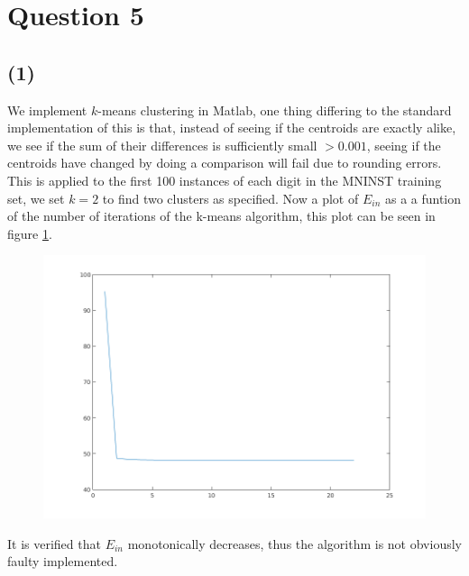 \documentclass[a4paper]{article}
\begin{document}
\newpage
\section*{Question 5}
\subsection*{(1)}
We implement $k$-means clustering in Matlab, one thing differing to the standard implementation of this is that, instead of seeing if the centroids are exactly alike, we see if the sum of their differences is sufficiently small $> 0.001$, seeing if the centroids have changed by doing a comparison will fail due to rounding errors.
\\
This is applied to the first 100 instances of each digit in the MNINST training set, we set $k = 2$ to find two clusters as specified. Now a plot of $E_{in}$ as a a funtion of the number of iterations of the k-means algorithm, this plot can be seen in figure \ref{opg51}.
\begin{figure}[H]
  \centering
  \includegraphics[width=\textwidth]{./51.png}
  \caption{}
  \label{opg51}
\end{figure}
It is verified that $E_{in}$ monotonically decreases, thus the algorithm is not obviously faulty implemented.
\newpage
\end{document}
